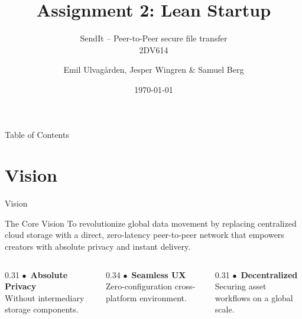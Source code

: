 \documentclass[aspectratio=169]{beamer}
\title[Lean Startup: SendIt]{Assignment 2: Lean Startup}
\subtitle{SendIt -- Peer-to-Peer secure file transfer \\ \small 2DV614}
\author[Ulvagården, Wingren, Berg]{Emil Ulvagården, Jesper Wingren \& Samuel Berg}
\institute[LNU]{Linnaeus University}
\date{\today}
\begin{document}
\begin{frame}[plain]
    \titlepage
\end{frame}

\begin{frame}{Table of Contents}
    \tableofcontents
\end{frame}


\section{Vision}
\begin{frame}{Vision}
    \begin{block}{The Core Vision}
        To revolutionize global data movement by replacing centralized cloud storage with a direct, zero-latency peer-to-peer network that empowers creators with absolute privacy and instant delivery.
    \end{block}

    \vspace{0.4cm}
    \begin{columns}[t]
        \begin{column}{0.31\textwidth}
            \centering
            \textcolor{SendItGreen}{\normalsize $\bullet$}\ \textbf{Absolute Privacy}\\
            \small Without intermediary storage components.
        \end{column}
        \begin{column}{0.34\textwidth}
            \centering
            \textcolor{SendItGreen}{\normalsize $\bullet$}\ \textbf{Seamless UX}\\
            \small Zero-configuration cross-platform environment.
        \end{column}
        \begin{column}{0.31\textwidth}
            \centering
            \textcolor{SendItGreen}{\normalsize $\bullet$}\ \textbf{Decentralized}\\
            \small Securing asset workflows on a global scale.
        \end{column}
    \end{columns}
\end{frame}
\end{document}
